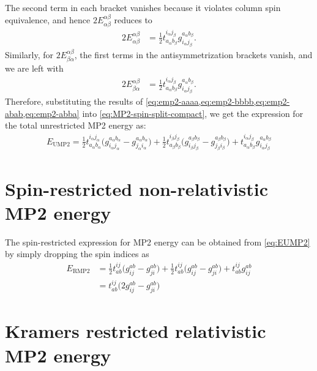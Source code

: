 \documentclass[11pt,oneside]{book}
\begin{document}
The second term in each bracket vanishes because it violates column spin equivalence, and hence $2E_{\alpha \beta}^{\alpha \beta}$ reduces to
\begin{align}\label{eq:emp2-abab}
    2E_{\alpha \beta}^{\alpha \beta}
    &= \frac{1}{2} t_{a_\alpha b_\beta}^{i_\alpha j_\beta} g_{i_\alpha j_\beta}^{a_\alpha b_\beta}.
\end{align}
Similarly, for $2E_{\beta \alpha}^{\alpha \beta}$, the first terms in the antisymmetrization brackets vanish, and we are left with
\begin{align}\label{eq:emp2-abba}
    2E_{\beta \alpha }^{\alpha \beta}
    &= \frac{1}{2} t_{a_\alpha b_\beta}^{i_\alpha j_\beta} g_{i_\alpha j_\beta}^{a_\alpha b_\beta}.
\end{align}
Therefore, substituting the results of \cref{eq:emp2-aaaa,eq:emp2-bbbb,eq:emp2-abab,eq:emp2-abba} into \cref{eq:MP2-spin-split-compact}, we get the expression for the total unrestricted MP2 energy as:
\begin{align}\label{eq:EUMP2}
    E_{\text{UMP2}} = \frac{1}{2} t_{a_\alpha b_\alpha}^{i_\alpha j_\alpha}
       \bigl( g_{i_\alpha j_\alpha}^{a_\alpha b_\alpha} - g_{j_\alpha i_\alpha}^{a_\alpha b_\alpha} \bigr) + \frac{1}{2} t_{a_\beta b_\beta}^{i_\beta j_\beta} 
       \bigl( g_{i_\beta j_\beta}^{a_\beta b_\beta} - g_{j_\beta i_\beta}^{a_\beta b_\beta} \bigr) + t_{a_\alpha b_\beta}^{i_\alpha j_\beta} g_{i_\alpha j_\beta}^{a_\alpha b_\beta}
\end{align}

\section{Spin-restricted non-relativistic MP2 energy}
The spin-restricted expression for MP2 energy can be obtained from \cref{eq:EUMP2} by simply dropping the spin indices as
\begin{align}
    E_{\text{RMP2}} &= \frac{1}{2} t_{a b}^{i j}
       \bigl( g_{i j}^{a b} - g_{j i}^{a b} \bigr) + \frac{1}{2} t_{a b}^{i j} 
       \bigl( g_{i j}^{a b} - g_{j i}^{a b} \bigr) + t_{a b}^{i j} g_{i j}^{a b} \\
       &=t_{a b}^{i j}
       \bigl( 2g_{i j}^{a b} - g_{j i}^{a b} \bigr)\label{eq:ERMP2}
\end{align}

\section{Kramers restricted relativistic MP2 energy}
\end{document}
